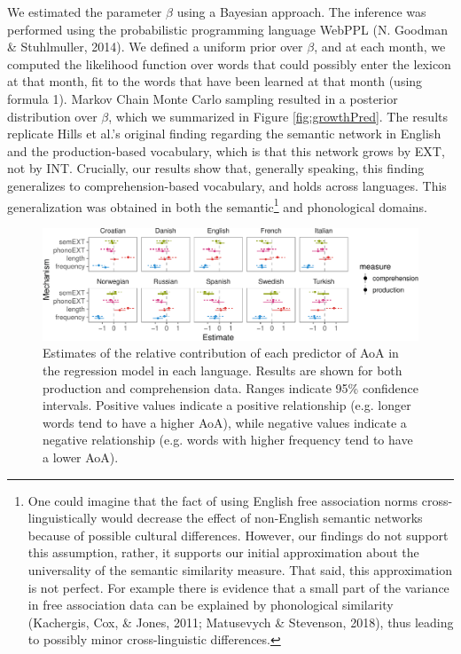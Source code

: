 \documentclass[english,floatsintext,man]{apa6}
\theoremstyle{definition}
\theoremstyle{definition}
\theoremstyle{definition}
\theoremstyle{remark}
\begin{document}
We estimated the parameter \(\beta\) using a Bayesian approach. The
inference was performed using the probabilistic programming language
WebPPL (N. Goodman \& Stuhlmuller, 2014). We defined a uniform prior
over \(\beta\), and at each month, we computed the likelihood function
over words that could possibly enter the lexicon at that month, fit to
the words that have been learned at that month (using formula 1). Markov
Chain Monte Carlo sampling resulted in a posterior distribution over
\(\beta\), which we summarized in Figure \ref{fig:growthPred}. The
results replicate Hills et al.'s original finding regarding the semantic
network in English and the production-based vocabulary, which is that
this network grows by EXT, not by INT. Crucially, our results show that,
generally speaking, this finding generalizes to comprehension-based
vocabulary, and holds across languages. This generalization was obtained
in both the semantic\footnote{One could imagine that the fact of using
  English free association norms cross-linguistically would decrease the
  effect of non-English semantic networks because of possible cultural
  differences. However, our findings do not support this assumption,
  rather, it supports our initial approximation about the universality
  of the semantic similarity measure. That said, this approximation is
  not perfect. For example there is evidence that a small part of the
  variance in free association data can be explained by phonological
  similarity (Kachergis, Cox, \& Jones, 2011; Matusevych \& Stevenson,
  2018), thus leading to possibly minor cross-linguistic differences.}
and phonological domains.

\begin{figure}[!h]
\includegraphics[width=\textwidth]{ms_files/figure-latex/staticPred-1} \caption{Estimates of the relative contribution of each predictor of AoA in the regression model in each language. Results are shown for both production and comprehension data. Ranges indicate 95\% confidence intervals. Positive values indicate a positive relationship (e.g. longer words tend to have a higher AoA), while negative values indicate a negative relationship (e.g. words with higher frequency tend to have a lower AoA).}\label{fig:staticPred}
\end{figure}
\end{document}
